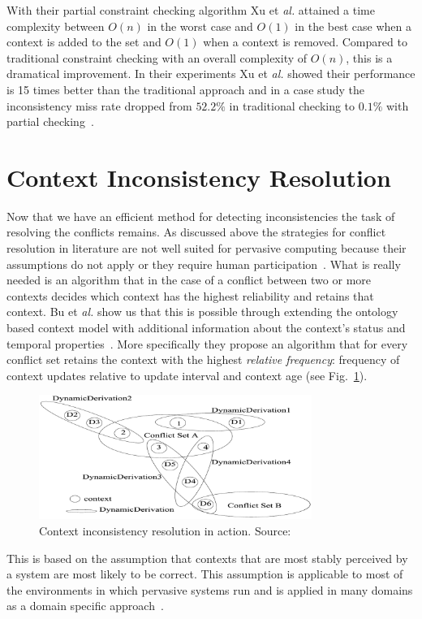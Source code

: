 \documentclass[journal]{vgtc}                %
\begin{document}
With their partial constraint checking algorithm Xu et \textit{al.} attained a time complexity between $O(n)$ in the worst case and $O(1)$ in the best case when a context is added to the set and $O(1)$ when a context is removed. Compared to traditional constraint checking with an overall complexity of $O(n)$, this is a dramatical improvement. In their experiments Xu et \textit{al.} showed their performance is 15 times better than the traditional approach and in a case study the inconsistency miss rate dropped from $52.2\%$ in traditional checking to $0.1\%$ with partial checking~\cite{xu:2010:PCC}.

\section{Context Inconsistency Resolution}
Now that we have an efficient method for detecting inconsistencies the task of resolving the conflicts remains. As discussed above the strategies for conflict resolution in literature are not well suited for pervasive computing because their assumptions do not apply or they require human participation~\cite{xu:2010:PCC}. What is really needed is an algorithm that in the case of a conflict between two or more contexts decides which context has the highest reliability and retains that context. Bu et \textit{al.} show us that this is possible through extending the ontology based context model with additional information about the context's status and temporal properties~\cite{bu:2006:CCM}. More specifically they propose an algorithm that for every conflict set retains the context with the highest \textit{relative frequency}: frequency of context updates relative to update interval and context age (see Fig.~\ref{fig:cir}). 
\begin{figure}[htb]
  \centering
  \includegraphics[width=3.5in]{cir}
  \caption{Context inconsistency resolution in action. Source:~\cite{bu:2006:CCM}}
  \label{fig:cir}
\end{figure}
This is based on the assumption that contexts that are most stably perceived by a system are most likely to be correct. This assumption is applicable to most of the environments in which pervasive systems run and is applied in many domains as a domain specific approach~\cite{xu:2010:PCC}.
\end{document}
